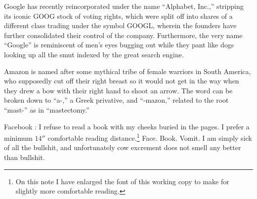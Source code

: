 \documentclass[letterpaper]{article}
\begin{document}
Google \cite{page2016alphabet} has recently reincorporated under the name ``Alphabet, Inc.,'' stripping its iconic GOOG stock of voting rights, which were split off into shares of a different class trading under the symbol GOOGL, wherein the founders have further consolidated their control of the company.  Furthermore, the very name ``Google'' is reminiscent of men's eyes bugging out while they pant like dogs looking up all the smut indexed by the great search engine.

Amazon \cite{amazon2016} is named after some mythical tribe of female warriors in South America, who supposedly cut off their right breast so it would not get in the way when they drew a bow with their right hand to shoot an arrow.  The word can be broken down to ``a-,'' a Greek privative, and ``-mazon,'' related to the root ``mast-'' as in ``mastectomy.''

Facebook \cite{facebook2016}:  I refuse to read a book with my cheeks buried in the pages.  I prefer a minimum $14''$ comfortable reading distance.\footnote{On this note I have enlarged the font of this working copy to make for slightly more comfortable reading.} Face. Book. Vomit.  I am simply sick of all the bullshit, and unfortunately cow excrement does not smell any better than bullshit.

 {}
\end{document}
